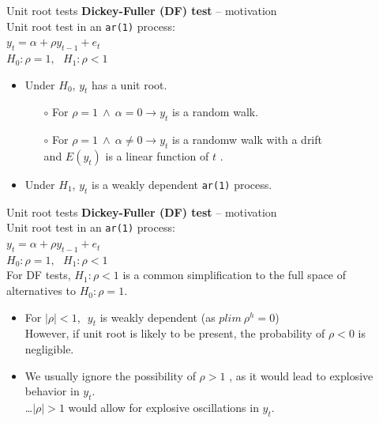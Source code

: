 \documentclass{beamer}
\begin{document}
\begin{frame}{Unit root tests}
\textbf{Dickey-Fuller (DF) test} – motivation \\
\medskip
Unit root test in an \texttt{ar(1)} process: \\
\medskip
$y_t = \alpha + \rho y_{t-1} + e_t$\\
\medskip
$ H_0 : \rho = 1, \> \> \> H_1 : \rho <1$ \\
\medskip
\begin{itemize}
\item Under $H_0$, $y_t$ has a unit root. 
\begin{itemize}
\item[$\circ$] For  $\rho =1 \ \wedge \ \alpha =0 \rightarrow y_t$     is a random walk.
\item[$\circ$] For  $\rho =1 \ \wedge \ \alpha \neq 0 \rightarrow y_t$     is a randomw walk with a drift   \\and $E(y_t)$ is a linear function of $t$ .
\end{itemize}
\item Under $H_1$, $y_t$  is a weakly dependent \texttt{ar(1)} process. \\
\bigskip
\end{itemize}
\medskip
\end{frame}
\begin{frame}{Unit root tests}
\textbf{Dickey-Fuller (DF) test} – motivation \\
\medskip
Unit root test in an \texttt{ar(1)} process: \\
\medskip
$y_t = \alpha + \rho y_{t-1} + e_t$\\
\medskip
$ H_0 : \rho = 1, \> \> \> H_1 : \rho <1$ \\
\medskip
For DF tests, $H_1 : \rho <1$ is a common simplification to the full space of alternatives to $H_0: \rho = 1$.
\begin{itemize}
\item For $|\rho|<1$, $\,\, y_t$  is weakly dependent (as $\textit{plim} \> \rho^h=0$)\\
However, if unit root is likely to be present, the probability of $\rho<0$ is negligible.
\item We usually ignore the possibility of $\rho >1$   , as it would lead to explosive behavior in $y_t$. \\
\dots $|\rho|>1$ would allow for explosive oscillations in $y_t$.
\end{itemize}
\end{frame}
\end{document}

